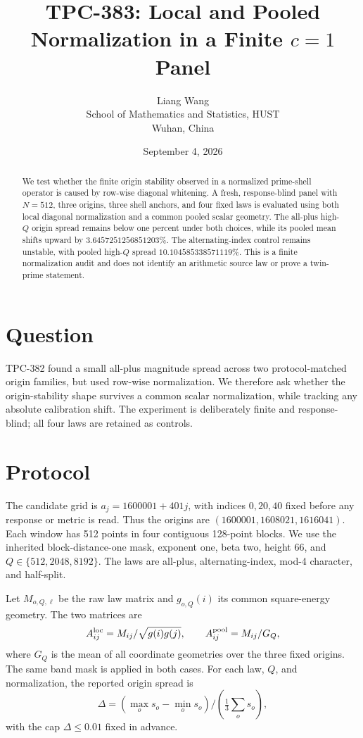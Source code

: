 \documentclass[10pt]{article}
\title{TPC-383: Local and Pooled Normalization in a Finite \(c=1\) Panel}
\author{Liang Wang\\School of Mathematics and Statistics, HUST\\Wuhan, China}
\date{September 4, 2026}
\begin{document}
\maketitle

\begin{abstract}
We test whether the finite origin stability observed in a normalized
prime-shell operator is caused by row-wise diagonal whitening.  A fresh,
response-blind panel with \(N=512\), three origins, three shell anchors, and
four fixed laws is evaluated using both local diagonal normalization and a
common pooled scalar geometry.  The all-plus high-\(Q\) origin spread remains
below one percent under both choices, while its pooled mean shifts upward by
\(3.6457251256851203\%\).  The alternating-index control remains unstable,
with pooled high-\(Q\) spread \(10.104585338571119\%\).  This is a finite
normalization audit and does not identify an arithmetic source law or prove a
twin-prime statement.
\end{abstract}

\section{Question}

TPC-382 found a small all-plus magnitude spread across two protocol-matched
origin families, but used row-wise normalization.  We therefore ask whether
the origin-stability shape survives a common scalar normalization, while
tracking any absolute calibration shift.  The experiment is deliberately
finite and response-blind; all four laws are retained as controls.

\section{Protocol}

The candidate grid is \(a_j=1600001+401j\), with indices \(0,20,40\) fixed
before any response or metric is read.  Thus the origins are
\((1600001,1608021,1616041)\).  Each window has 512 points in four contiguous
128-point blocks.  We use the inherited block-distance-one mask, exponent one,
beta two, height 66, and \(Q\in\{512,2048,8192\}\).  The laws are all-plus,
alternating-index, mod-4 character, and half-split.

Let \(M_{o,Q,\ell}\) be the raw law matrix and \(g_{o,Q}(i)\) its common
square-energy geometry.  The two matrices are
\[
 A^{\rm loc}_{ij}=M_{ij}/\sqrt{g(i)g(j)},\qquad
 A^{\rm pool}_{ij}=M_{ij}/G_Q,
\]
where \(G_Q\) is the mean of all coordinate geometries over the three fixed
origins.  The same band mask is applied in both cases.  For each law, \(Q\),
and normalization, the reported origin spread is
\[
 \Delta=(\max_o s_o-\min_o s_o)/(\tfrac13\sum_o s_o),
\]
with the cap \(\Delta\leq0.01\) fixed in advance.
\end{document}
